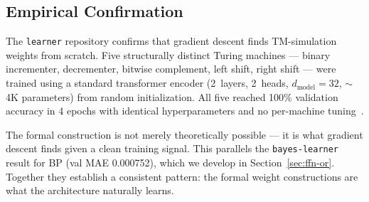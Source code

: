 \subsection*{Empirical Confirmation}

The \texttt{learner} repository confirms that gradient descent finds
TM-simulation weights from scratch. Five structurally distinct Turing machines
--- binary incrementer, decrementer, bitwise complement, left shift, right
shift --- were trained using a standard transformer encoder (2~layers, 2~heads,
$d_{\mathrm{model}} = 32$, $\sim$4K parameters) from random initialization.
All five reached 100\% validation accuracy in 4 epochs with identical
hyperparameters and no per-machine tuning~\cite{coppola2026transformers}.

The formal construction is not merely theoretically possible --- it is what
gradient descent finds given a clean training signal. This parallels the
\texttt{bayes-learner} result for BP (val MAE 0.000752), which we develop in
Section~\ref{sec:ffn-or}. Together they establish a consistent pattern: the
formal weight constructions are what the architecture naturally learns.